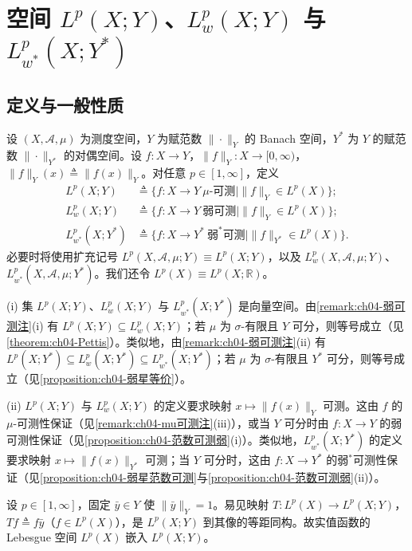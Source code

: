 \documentclass[../../main.tex]{subfiles}%
\begin{document}
\section{空间 $L^p(X;Y)$、$L^p_w(X;Y)$ 与 $L^p_{w^*}(X;Y^*)$}\label{section:ch04-Lp空间}

\subsection{定义与一般性质}\label{subsection:ch04-Lp定义}

设 $(X,\mathcal{A},\mu)$ 为测度空间，$Y$ 为赋范数 $\|\cdot\|_Y$ 的 Banach 空间，$Y^*$ 为 $Y$ 的赋范数 $\|\cdot\|_{Y^*}$ 的对偶空间。设 $f:X\to Y$，$\|f\|_Y:X\to[0,\infty)$，$\|f\|_Y(x)\triangleq \|f(x)\|_Y$。对任意 $p\in[1,\infty]$，定义
\begin{align*}
L^p(X;Y)&\triangleq \{f:X\to Y\ \mu\text{-可测}\mid \|f\|_Y\in L^p(X)\};\\
L^p_w(X;Y)&\triangleq \{f:X\to Y\ \text{弱可测}\mid \|f\|_Y\in L^p(X)\};\\
L^p_{w^*}(X;Y^*)&\triangleq \{f:X\to Y^*\ \text{弱}^*\text{可测}\mid \|f\|_{Y^*}\in L^p(X)\}.
\end{align*}
必要时将使用扩充记号 $L^p(X,\mathcal{A},\mu;Y)\equiv L^p(X;Y)$，以及 $L^p_w(X,\mathcal{A},\mu;Y)$、$L^p_{w^*}(X,\mathcal{A},\mu;Y^*)$。我们还令 $L^p(X)\equiv L^p(X;\mathbb{R})$。

\begin{remark}\label{remark:ch04-Lp包含}
(i) 集 $L^p(X;Y)$、$L^p_w(X;Y)$ 与 $L^p_{w^*}(X;Y^*)$ 是向量空间。由\cref{remark:ch04-弱可测注}(i) 有 $L^p(X;Y)\subseteq L^p_w(X;Y)$；若 $\mu$ 为 $\sigma$-有限且 $Y$ 可分，则等号成立（见\cref{theorem:ch04-Pettis}）。类似地，由\cref{remark:ch04-弱可测注}(ii) 有 $L^p(X;Y^*)\subseteq L^p_w(X;Y^*)\subseteq L^p_{w^*}(X;Y^*)$；若 $\mu$ 为 $\sigma$-有限且 $Y^*$ 可分，则等号成立（见\cref{proposition:ch04-弱星等价}）。

(ii) $L^p(X;Y)$ 与 $L^p_w(X;Y)$ 的定义要求映射 $x\mapsto\|f(x)\|_Y$ 可测。这由 $f$ 的 $\mu$-可测性保证（见\cref{remark:ch04-mu可测注}(iii)），或当 $Y$ 可分时由 $f:X\to Y$ 的弱可测性保证（见\cref{proposition:ch04-范数可测弱}(i)）。类似地，$L^p_{w^*}(X;Y^*)$ 的定义要求映射 $x\mapsto\|f(x)\|_{Y^*}$ 可测；当 $Y$ 可分时，这由 $f:X\to Y^*$ 的弱$^*$可测性保证（见\cref{proposition:ch04-弱星范数可测}与\cref{proposition:ch04-范数可测弱}(ii)）。
\end{remark}

\begin{remark}\label{remark:ch04-标量嵌入}
设 $p\in[1,\infty]$，固定 $\bar y\in Y$ 使 $\|\bar y\|_Y=1$。易见映射 $T:L^p(X)\to L^p(X;Y)$，$Tf\triangleq f\bar y$（$f\in L^p(X)$），是 $L^p(X;Y)$ 到其像的等距同构。故实值函数的 Lebesgue 空间 $L^p(X)$ 嵌入 $L^p(X;Y)$。
\end{remark}
\end{document}
